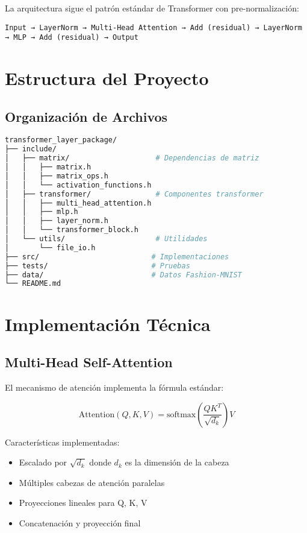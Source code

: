 \documentclass[12pt,a4paper]{article}
\begin{document}
La arquitectura sigue el patrón estándar de Transformer con pre-normalización:

\begin{center}
\texttt{Input → LayerNorm → Multi-Head Attention → Add (residual) → LayerNorm → MLP → Add (residual) → Output}
\end{center}

\section{Estructura del Proyecto}

\subsection{Organización de Archivos}

\begin{lstlisting}[language=bash, caption=Estructura del proyecto]
transformer_layer_package/
├── include/
│   ├── matrix/                    # Dependencias de matriz
│   │   ├── matrix.h
│   │   ├── matrix_ops.h
│   │   └── activation_functions.h
│   ├── transformer/               # Componentes transformer
│   │   ├── multi_head_attention.h
│   │   ├── mlp.h
│   │   ├── layer_norm.h
│   │   └── transformer_block.h
│   └── utils/                     # Utilidades
│       └── file_io.h
├── src/                          # Implementaciones
├── tests/                        # Pruebas
├── data/                         # Datos Fashion-MNIST
└── README.md
\end{lstlisting}

\section{Implementación Técnica}

\subsection{Multi-Head Self-Attention}

El mecanismo de atención implementa la fórmula estándar:

\begin{equation}
\text{Attention}(Q, K, V) = \text{softmax}\left(\frac{QK^T}{\sqrt{d_k}}\right)V
\end{equation}

Características implementadas:
\begin{itemize}
    \item Escalado por $\sqrt{d_k}$ donde $d_k$ es la dimensión de la cabeza
    \item Múltiples cabezas de atención paralelas
    \item Proyecciones lineales para Q, K, V
    \item Concatenación y proyección final
\end{itemize}
\end{document}
